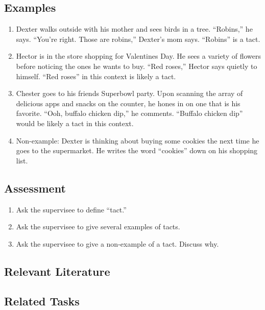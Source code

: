 \subsection{Examples}
\begin{enumerate}
\item Dexter walks outside with his mother and sees birds in a tree.  ``Robins,'' he says.  ``You're right. Those are robins,'' Dexter's mom says. ``Robins'' is a tact.
\item Hector is in the store shopping for Valentines Day.  He sees a variety of flowers before noticing the ones he wants to buy.  ``Red roses,'' Hector says quietly to himself. ``Red roses'' in this context is likely a tact. 
\item Chester goes to his friends Superbowl party.  Upon scanning the array of delicious apps and snacks on the counter, he hones in on one that is his favorite.  ``Ooh, buffalo chicken dip,'' he comments.  ``Buffalo chicken dip'' would be likely a tact in this context.
\item Non-example: Dexter is thinking about buying some cookies the next time he goes to the supermarket.  He writes the word ``cookies'' down on his shopping list. 
%
\end{enumerate}
%
\subsection{Assessment}
\begin{enumerate}
\item Ask the supervisee to define ``tact.''  
\item Ask the supervisee to give several examples of tacts.
\item Ask the supervisee to give a non-example of a tact. Discuss why.
%
\end{enumerate}
%
\subsection{Relevant Literature}
\begin{refsection}
\nocite{test,alang2017police,clayton2018black}
\printbibliography[heading=none]
\end{refsection}
%
\subsection{Related Tasks}
\fourdTwelve{}\\
%
%
%
%
%
%
